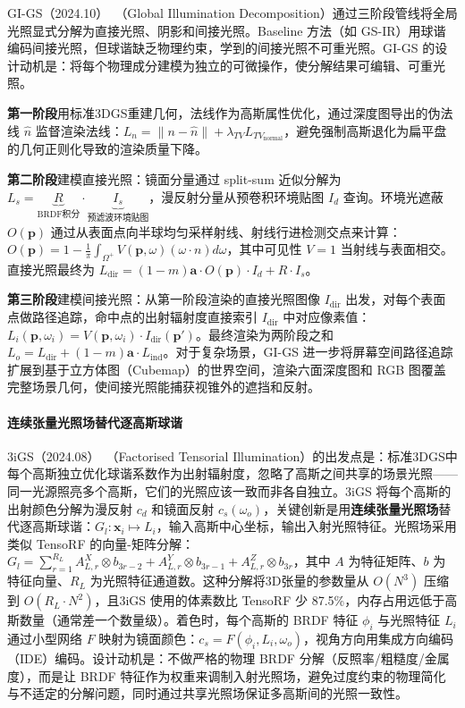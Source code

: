 GI-GS（2024.10）~\cite{2410_02619}（Global Illumination Decomposition）通过三阶段管线将全局光照显式分解为直接光照、阴影和间接光照。Baseline 方法（如 GS-IR）用球谐编码间接光照，但球谐缺乏物理约束，学到的间接光照不可重光照。GI-GS 的设计动机是：将每个物理成分建模为独立的可微操作，使分解结果可编辑、可重光照。

\textbf{第一阶段}用标准3DGS重建几何，法线作为高斯属性优化，通过深度图导出的伪法线 $\hat{n}$ 监督渲染法线：$L_n = \|n - \hat{n}\| + \lambda_{TV} L_{TV_{\text{normal}}}$，避免强制高斯退化为扁平盘的几何正则化导致的渲染质量下降。

\textbf{第二阶段}建模直接光照：镜面分量通过 split-sum 近似分解为 $L_s = \underbrace{R}_{\text{BRDF积分}} \cdot \underbrace{I_s}_{\text{预滤波环境贴图}}$，漫反射分量从预卷积环境贴图 $I_d$ 查询。环境光遮蔽 $O(\mathbf{p})$ 通过从表面点向半球均匀采样射线、射线行进检测交点来计算：$O(\mathbf{p}) = 1 - \frac{1}{\pi}\int_{\Omega^+} V(\mathbf{p}, \omega) (\omega \cdot n) d\omega$，其中可见性 $V=1$ 当射线与表面相交。直接光照最终为 $L_{\text{dir}} = (1-m)\boldsymbol{a} \cdot O(\mathbf{p}) \cdot I_d + R \cdot I_s$。

\textbf{第三阶段}建模间接光照：从第一阶段渲染的直接光照图像 $I_{\text{dir}}$ 出发，对每个表面点做路径追踪，命中点的出射辐射度直接索引 $I_{\text{dir}}$ 中对应像素值：$L_i(\mathbf{p}, \omega_i) = V(\mathbf{p}, \omega_i) \cdot I_{\text{dir}}(\mathbf{p}')$。最终渲染为两阶段之和 $L_o = L_{\text{dir}} + (1-m)\boldsymbol{a} \cdot L_{\text{ind}}$。对于复杂场景，GI-GS 进一步将屏幕空间路径追踪扩展到基于立方体图（Cubemap）的世界空间，渲染六面深度图和 RGB 图覆盖完整场景几何，使间接光照能捕获视锥外的遮挡和反射。

\paragraph{连续张量光照场替代逐高斯球谐}

3iGS（2024.08）~\cite{2408_03753}（Factorised Tensorial Illumination）的出发点是：标准3DGS中每个高斯独立优化球谐系数作为出射辐射度，忽略了高斯之间共享的场景光照——同一光源照亮多个高斯，它们的光照应该一致而非各自独立。3iGS 将每个高斯的出射颜色分解为漫反射 $c_d$ 和镜面反射 $c_s(\omega_o)$，关键创新是用\textbf{连续张量光照场}替代逐高斯球谐：$G_l: \mathbf{x}_i \mapsto L_i$，输入高斯中心坐标，输出入射光照特征。光照场采用类似 TensoRF 的向量-矩阵分解：$G_l = \sum_{r=1}^{R_L} A_{L,r}^X \otimes b_{3r-2} + A_{L,r}^Y \otimes b_{3r-1} + A_{L,r}^Z \otimes b_{3r}$，其中 $A$ 为特征矩阵、$b$ 为特征向量、$R_L$ 为光照特征通道数。这种分解将3D张量的参数量从 $O(N^3)$ 压缩到 $O(R_L \cdot N^2)$，且3iGS 使用的体素数比 TensoRF 少 87.5\%，内存占用远低于高斯数量（通常差一个数量级）。着色时，每个高斯的 BRDF 特征 $\phi_i$ 与光照特征 $L_i$ 通过小型网络 $F$ 映射为镜面颜色：$c_s = F(\phi_i, L_i, \omega_o)$，视角方向用集成方向编码（IDE）编码。设计动机是：不做严格的物理 BRDF 分解（反照率/粗糙度/金属度），而是让 BRDF 特征作为权重来调制入射光照场，避免过度约束的物理简化与不适定的分解问题，同时通过共享光照场保证多高斯间的光照一致性。


